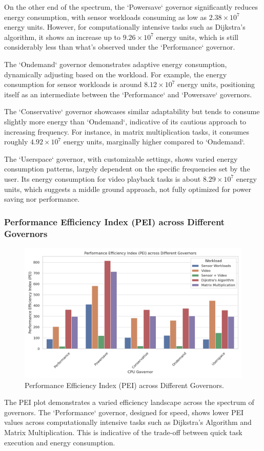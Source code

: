 \documentclass[conference]{IEEEtran}
\begin{document}
On the other end of the spectrum, the `Powersave` governor significantly reduces energy consumption, with sensor workloads consuming as low as \(2.38 \times 10^7\) energy units. However, for computationally intensive tasks such as Dijkstra's algorithm, it shows an increase up to \(9.26 \times 10^7\) energy units, which is still considerably less than what's observed under the `Performance` governor.

The `Ondemand` governor demonstrates adaptive energy consumption, dynamically adjusting based on the workload. For example, the energy consumption for sensor workloads is around \(8.12 \times 10^7\) energy units, positioning itself as an intermediate between the `Performance` and `Powersave` governors.

The `Conservative` governor showcases similar adaptability but tends to consume slightly more energy than `Ondemand`, indicative of its cautious approach to increasing frequency. For instance, in matrix multiplication tasks, it consumes roughly \(4.92 \times 10^7\) energy units, marginally higher compared to `Ondemand`.

The `Userspace` governor, with customizable settings, shows varied energy consumption patterns, largely dependent on the specific frequencies set by the user. Its energy consumption for video playback tasks is about \(8.29 \times 10^7\) energy units, which suggests a middle ground approach, not fully optimized for power saving nor performance.

\subsubsection{Performance Efficiency Index (PEI) across Different Governors}
\begin{figure}[ht]
    \centering
    \includegraphics[width=0.9\linewidth]{pei_plot.png}
    \caption{Performance Efficiency Index (PEI) across Different Governors.}
    \label{fig:pei}
\end{figure}
\vspace{10pt}
The PEI plot demonstrates a varied efficiency landscape across the spectrum of governors. The `Performance` governor, designed for speed, shows lower PEI values across computationally intensive tasks such as Dijkstra's Algorithm and Matrix Multiplication. This is indicative of the trade-off between quick task execution and energy consumption.
\end{document}
